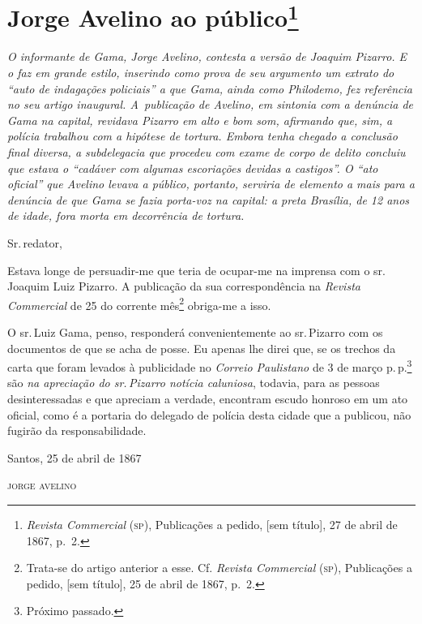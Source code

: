 \chapter{Jorge Avelino ao público\footnote{
\emph{Revista Commercial} (\textsc{sp}), Publicações a pedido, {[}sem título{]}, 
27 de abril de 1867, p.~2.}}

\begin{didascalia}\itshape
O informante de Gama, Jorge Avelino, contesta a versão de Joaquim
Pizarro. E o faz em grande estilo, inserindo como prova de seu argumento
um extrato do ``auto de indagações policiais'' a que Gama, ainda como
Philodemo, fez referência no seu artigo inaugural. A~publicação de
Avelino, em sintonia com a denúncia de Gama na capital, revidava Pizarro
em alto e bom som, afirmando que, sim, a polícia trabalhou com a
hipótese de tortura. Embora tenha chegado a conclusão final diversa, a
subdelegacia que procedeu com exame de corpo de delito concluiu que
estava o ``cadáver com algumas escoriações devidas a castigos''. O ``ato
oficial'' que Avelino levava a público, portanto, serviria de elemento a
mais para a denúncia de que Gama se fazia porta-voz na capital: a preta
Brasília, de 12 anos de idade, fora morta em decorrência de tortura.
\end{didascalia}

Sr.\,redator,

Estava longe de persuadir-me que teria de ocupar-me na imprensa com o
sr.\,Joaquim Luiz Pizarro. A publicação da sua correspondência na
\emph{Revista Commercial} de 25 do corrente mês\footnote{ Trata-se
  do artigo anterior a esse. Cf. \emph{Revista Commercial} (\textsc{sp}),
  Publicações a pedido, {[}sem título{]}, 25 de abril de 1867, p.~2.} obriga-me a
isso.

O sr.\,Luiz Gama, penso, responderá convenientemente ao sr.\,Pizarro com
os documentos de que se acha de posse. Eu apenas lhe direi que, se os
trechos da carta que foram levados à publicidade no \emph{Correio
Paulistano} de 3 de março p.\,p.\footnote{ Próximo
  passado.} são \emph{na apreciação do sr.\,Pizarro notícia caluniosa},
todavia, para as pessoas desinteressadas e que apreciam a verdade,
encontram escudo honroso em um ato oficial, como é a portaria do
delegado de polícia desta cidade que a publicou, não fugirão da
responsabilidade.

\begin{flushright}
Santos, 25 de abril de 1867

\textsc{jorge avelino}
\end{flushright}

